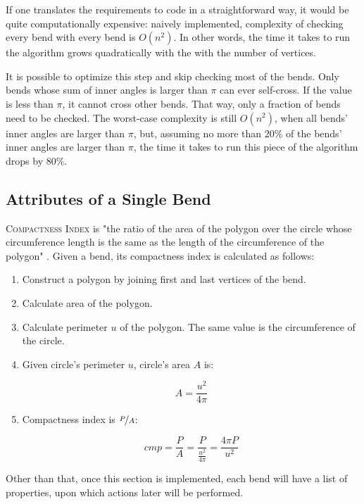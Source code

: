 \documentclass[a4paper]{article}
\begin{document}
If one translates the requirements to code in a straightforward way, it would
be quite computationally expensive: naively implemented, complexity of checking
every bend with every bend is $O(n^2)$. In other words, the time it takes to
run the algorithm grows quadratically with the with the number of vertices.

It is possible to optimize this step and skip checking most of the bends. Only
bends whose sum of inner angles is larger than $\pi$ can ever self-cross. If
the value is less than $\pi$, it cannot cross other bends. That way, only a
fraction of bends need to be checked. The worst-case complexity is still
$O(n^2)$, when all bends' inner angles are larger than $\pi$, but, assuming no
more than $20\%$ of the bends' inner angles are larger than $\pi$, the time it
takes to run this piece of the algorithm drops by $80\%$.

\subsection{Attributes of a Single Bend}

\textsc{Compactness Index} is "the ratio of the area of the polygon over the
circle whose circumference length is the same as the length of the
circumference of the polygon" \cite{wang1998line}. Given a bend, its
compactness index is calculated as follows:

\begin{enumerate}

  \item Construct a polygon by joining first and last vertices of the bend.

  \item Calculate area of the polygon.

  \item Calculate perimeter $u$ of the polygon. The same value is the
      circumference of the circle.

  \item Given circle's perimeter $u$, circle's area $A$ is:

    \[
      A = \frac{u^2}{4\pi}
    \]

  \item Compactness index is $\nicefrac{P}{A}$:

    \[
      cmp = \frac{P}{A} = \frac{P}{ \frac{u^2}{4\pi} } = \frac{4\pi P}{u^2}
    \]

\end{enumerate}

Other than that, once this section is implemented, each bend will have a list
of properties, upon which actions later will be performed.
\end{document}
